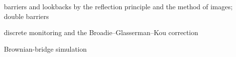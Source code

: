 \begin{planned}
  \item barriers and lookbacks by the reflection principle and the method of images; double barriers
  \item discrete monitoring and the Broadie--Glasserman--Kou correction
  \item Brownian-bridge simulation
\end{planned}
